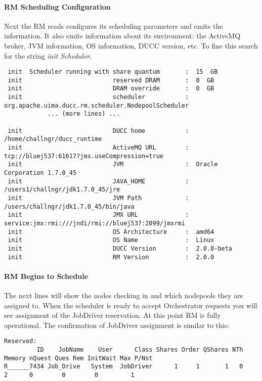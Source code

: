    \paragraph{RM Scheduling Configuration}
   Next the RM reads configures its scheduling parameters and emits the information.  It also emits information
   about its environment: the ActiveMQ broker, JVM information, OS information, DUCC version, etc.  To fine
   this search for the string {\em init  Scheduler}.
\begin{verbatim}
 init  Scheduler running with share quantum       :  15  GB
 init                         reserved DRAM       :  0  GB
 init                         DRAM override       :  0  GB
 init                         scheduler           :  org.apache.uima.ducc.rm.scheduler.NodepoolScheduler
            ... (more lines) ...

 init                         DUCC home           :  /home/challngr/ducc_runtime
 init                         ActiveMQ URL        :  tcp://bluej537:61617?jms.useCompression=true
 init                         JVM                 :  Oracle Corporation 1.7.0_45
 init                         JAVA_HOME           :  /users1/challngr/jdk1.7.0_45/jre
 init                         JVM Path            :  /users/challngr/jdk1.7.0_45/bin/java
 init                         JMX URL             :  service:jmx:rmi:///jndi/rmi://bluej537:2099/jmxrmi
 init                         OS Architecture     :  amd64
 init                         OS Name             :  Linux
 init                         DUCC Version        :  2.0.0-beta
 init                         RM Version          :  2.0.0
\end{verbatim}

   \paragraph{RM Begins to Schedule}
   The next lines will show the nodes checking in and which nodepools they are assigned to.  When the scheduler is
   ready to accept Orchestrator requests you will see assignment of the JobDriver reservation.  At this point
   RM is fully operational.  The confirmation of JobDriver assignment is similar to this:
\begin{verbatim}
Reserved:
         ID    JobName    User      Class Shares Order QShares NTh Memory nQuest Ques Rem InitWait Max P/Nst
R______7434 Job_Drive   System  JobDriver      1     1       1   0      2      0        0        0         1
\end{verbatim}

